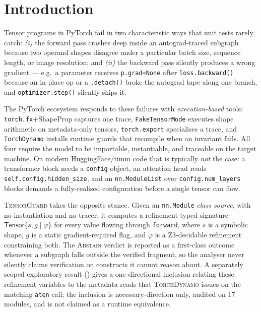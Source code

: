 \section{Introduction}\label{sec:intro}

Tensor programs in PyTorch fail in two characteristic ways that
unit tests rarely catch: \emph{(i)} the forward pass crashes deep
inside an autograd-traced subgraph because two operand shapes
disagree under a particular batch size, sequence length, or
image resolution; and \emph{(ii)} the backward pass silently
produces a wrong gradient --- e.g.\ a parameter receives
\texttt{p.grad=None} after \texttt{loss.backward()} because an
in-place op or a \verb|.detach()| broke the autograd tape along
one branch, and \texttt{optimizer.step()} silently skips it.

The PyTorch ecosystem responds to these failures with
\emph{execution-based} tools: \texttt{torch.fx}+ShapeProp
captures one trace, \texttt{FakeTensorMode} executes shape
arithmetic on metadata-only tensors, \texttt{torch.export}
specialises a trace, and \texttt{TorchDynamo} installs runtime
guards that recompile when an invariant fails. All four require
the model to be importable, instantiable, and traceable on the
target machine. On modern HuggingFace/timm code that is
typically \emph{not} the case: a transformer block needs a
\texttt{config} object, an attention head reads
\texttt{self.config.hidden\_size}, and an
\texttt{nn.ModuleList} over \texttt{config.num\_layers} blocks
demands a fully-realised configuration before a single tensor
can flow.

\textsc{TensorGuard} takes the opposite stance. Given an
\texttt{nn.Module} \emph{class source}, with no instantiation
and no tracer, it computes a refinement-typed signature
$\mathsf{Tensor}\{s,g\mid\varphi\}$ for every value flowing
through \texttt{forward}, where $s$ is a symbolic shape, $g$ is
a static gradient-required flag, and $\varphi$ is a
Z3-decidable refinement constraining both. The
\textsc{Abstain} verdict is reported as a first-class outcome
whenever a subgraph falls outside the verified fragment, so the
analyser never silently claims verification on constructs it
cannot reason about. A separately scoped exploratory result
() gives a one-directional inclusion
relating these refinement variables to the metadata reads that
\textsc{TorchDynamo} issues on the matching \texttt{aten} call;
the inclusion is necessary-direction only, audited on $17$
modules, and is not claimed as a runtime equivalence.

